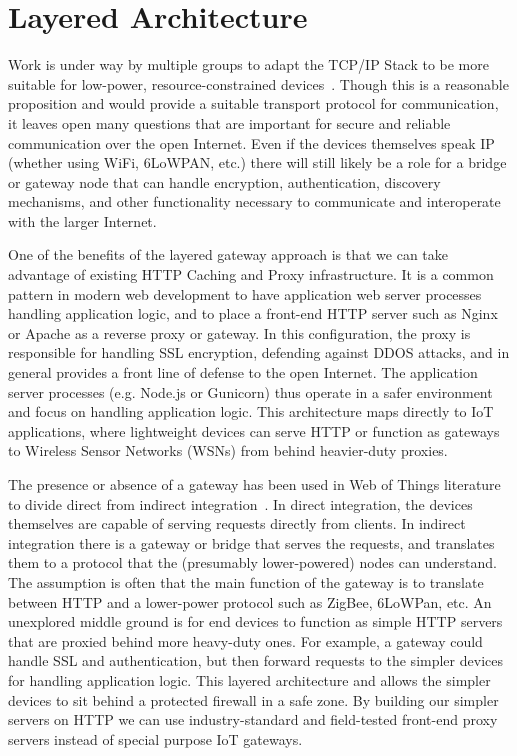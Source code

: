 \documentclass{acm_proc_article-sp}
\begin{document}
\section{Layered Architecture}

Work is under way by multiple groups to adapt the TCP/IP Stack to be more
suitable for low-power, resource-constrained devices~\cite{iotsurvey}. Though
this is a reasonable proposition and would provide a suitable transport
protocol for communication, it leaves open many questions that are important
for secure and reliable communication over the open Internet. Even if the
devices themselves speak IP (whether using WiFi, 6LoWPAN, etc.) there will
still likely be a role for a bridge or gateway node that can handle encryption,
authentication, discovery mechanisms, and other functionality necessary to
communicate and interoperate with the larger Internet.

One of the benefits of the layered gateway approach is that we can take
advantage of existing HTTP Caching and Proxy infrastructure. It is a common
pattern in modern web development to have application web server processes
handling application logic, and to place a front-end HTTP server such as Nginx
or Apache as a reverse proxy or gateway. In this configuration, the proxy is
responsible for handling SSL encryption, defending against DDOS attacks, and in
general provides a front line of defense to the open Internet. The application
server processes (e.g.  Node.js or Gunicorn) thus operate in a safer
environment and focus on handling application logic. This architecture maps
directly to IoT applications, where lightweight devices can serve HTTP or
function as gateways to Wireless Sensor Networks (WSNs) from behind
heavier-duty proxies.

The presence or absence of a gateway has been used in Web of Things literature
to divide direct from indirect integration~\cite{wotsurvey}. In direct
integration, the devices themselves are capable of serving requests directly
from clients. In indirect integration there is a gateway or bridge that serves
the requests, and translates them to a protocol that the (presumably
lower-powered) nodes can understand. The assumption is often that the main
function of the gateway is to translate between HTTP and a lower-power protocol
such as ZigBee, 6LoWPan, etc. An unexplored middle ground is for end devices to
function as simple HTTP servers that are proxied behind more heavy-duty ones.
For example, a gateway could handle SSL and authentication, but then forward
requests to the simpler devices for handling application logic. This layered
architecture  and allows the simpler devices to sit behind a protected firewall
in a safe zone. By building our simpler servers on HTTP we can use
industry-standard and field-tested front-end proxy servers instead of special
purpose IoT gateways.
\end{document}
